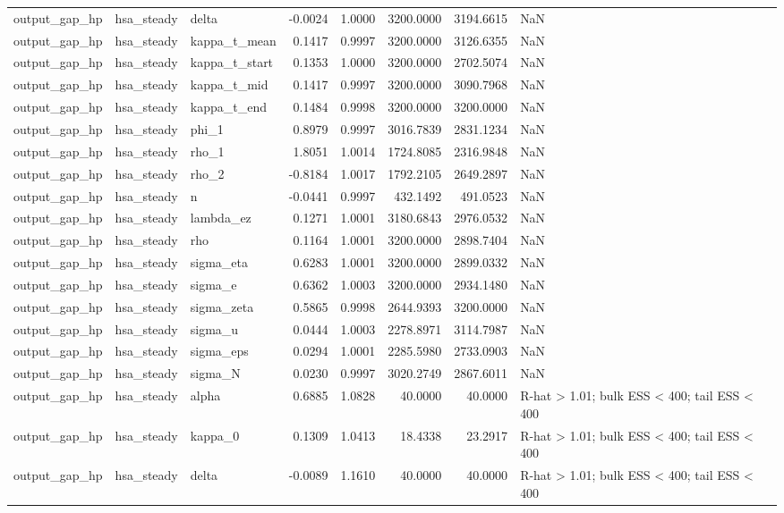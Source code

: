 \begin{tabular}{lllrrrrl}
output\_gap\_hp & hsa\_steady & delta & -0.0024 & 1.0000 & 3200.0000 & 3194.6615 & NaN \\
output\_gap\_hp & hsa\_steady & kappa\_t\_mean & 0.1417 & 0.9997 & 3200.0000 & 3126.6355 & NaN \\
output\_gap\_hp & hsa\_steady & kappa\_t\_start & 0.1353 & 1.0000 & 3200.0000 & 2702.5074 & NaN \\
output\_gap\_hp & hsa\_steady & kappa\_t\_mid & 0.1417 & 0.9997 & 3200.0000 & 3090.7968 & NaN \\
output\_gap\_hp & hsa\_steady & kappa\_t\_end & 0.1484 & 0.9998 & 3200.0000 & 3200.0000 & NaN \\
output\_gap\_hp & hsa\_steady & phi\_1 & 0.8979 & 0.9997 & 3016.7839 & 2831.1234 & NaN \\
output\_gap\_hp & hsa\_steady & rho\_1 & 1.8051 & 1.0014 & 1724.8085 & 2316.9848 & NaN \\
output\_gap\_hp & hsa\_steady & rho\_2 & -0.8184 & 1.0017 & 1792.2105 & 2649.2897 & NaN \\
output\_gap\_hp & hsa\_steady & n & -0.0441 & 0.9997 & 432.1492 & 491.0523 & NaN \\
output\_gap\_hp & hsa\_steady & lambda\_ez & 0.1271 & 1.0001 & 3180.6843 & 2976.0532 & NaN \\
output\_gap\_hp & hsa\_steady & rho & 0.1164 & 1.0001 & 3200.0000 & 2898.7404 & NaN \\
output\_gap\_hp & hsa\_steady & sigma\_eta & 0.6283 & 1.0001 & 3200.0000 & 2899.0332 & NaN \\
output\_gap\_hp & hsa\_steady & sigma\_e & 0.6362 & 1.0003 & 3200.0000 & 2934.1480 & NaN \\
output\_gap\_hp & hsa\_steady & sigma\_zeta & 0.5865 & 0.9998 & 2644.9393 & 3200.0000 & NaN \\
output\_gap\_hp & hsa\_steady & sigma\_u & 0.0444 & 1.0003 & 2278.8971 & 3114.7987 & NaN \\
output\_gap\_hp & hsa\_steady & sigma\_eps & 0.0294 & 1.0001 & 2285.5980 & 2733.0903 & NaN \\
output\_gap\_hp & hsa\_steady & sigma\_N & 0.0230 & 0.9997 & 3020.2749 & 2867.6011 & NaN \\
output\_gap\_hp & hsa\_steady & alpha & 0.6885 & 1.0828 & 40.0000 & 40.0000 & R-hat > 1.01; bulk ESS < 400; tail ESS < 400 \\
output\_gap\_hp & hsa\_steady & kappa\_0 & 0.1309 & 1.0413 & 18.4338 & 23.2917 & R-hat > 1.01; bulk ESS < 400; tail ESS < 400 \\
output\_gap\_hp & hsa\_steady & delta & -0.0089 & 1.1610 & 40.0000 & 40.0000 & R-hat > 1.01; bulk ESS < 400; tail ESS < 400 \\

\end{tabular}
